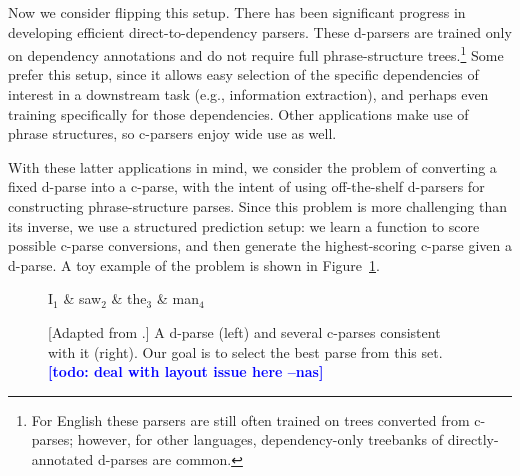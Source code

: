 \documentclass[11pt,letterpaper]{article}
\newcommand{\nascomment}[1]{\textcolor{blue}{\bf \small [#1 --nas]}}
\begin{document}
Now we consider flipping this setup. There has been significant
progress in developing efficient direct-to-dependency parsers. These
d-parsers are trained only on dependency annotations and do not
require full phrase-structure trees.\footnote{For English these
  parsers are still often trained on trees converted from c-parses;
  however, for other languages, dependency-only treebanks of
  directly-annotated d-parses are common.}  
Some prefer this setup, since it allows easy selection of the specific
dependencies of interest in a downstream task (e.g., information
extraction), and perhaps even training specifically for those
dependencies.  Other applications make use of phrase structures, so
c-parsers enjoy wide use as well.




With these latter applications in mind, we consider the problem of
converting a fixed d-parse into a c-parse, with the intent of
using off-the-shelf d-parsers for constructing phrase-structure
parses.  Since this problem is more challenging than its inverse, we
use a structured prediction setup: we learn a function to score
possible c-parse conversions, and then generate the highest-scoring
c-parse given a d-parse. A toy example of the problem is shown in
Figure~\ref{fig:inverse}.



\begin{figure}
  \centering

  \vspace{-1cm}
  \begin{dependency}[theme=simple]
    \begin{deptext}[column sep=0.7cm]
      I$_1$ \& saw$_2$ \& the$_3$ \& man$_4$ \\
    \end{deptext}
  \end{dependency}   \vspace{-2cm} 
  
  
  \caption{{
      [Adapted from \cite{collins1999statistical}.] A d-parse (left)
      and several c-parses consistent with it (right).  Our goal is to select
      the best parse from this set. \label{fig:inverse}
      \nascomment{todo:  deal with layout issue here}
    }
    }
\end{figure}
\end{document}
